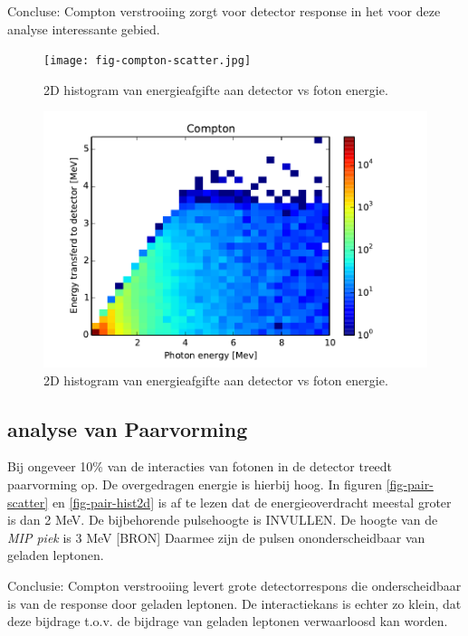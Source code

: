 \documentclass[a4paper,11pt]{article}
\begin{document}
Concluse: Compton verstrooiing zorgt voor detector response in het voor deze analyse interessante gebied.

\begin{figure}[t]
  \begin{center}
    \texttt{[image: fig-compton-scatter.jpg]}
    \caption{\label{fig:compton-scatter} 2D histogram van energieafgifte aan detector vs foton energie.}
  \end{center}
  \begin{center}
    \includegraphics{fig-compton-hist2d.pdf}
    \caption{\label{fig:compton-hist2d} 2D histogram van energieafgifte aan detector vs foton energie.}
  \end{center}
\end{figure}




\subsection{analyse van Paarvorming}
Bij ongeveer 10\% van de interacties van fotonen in de detector treedt paarvorming op. De overgedragen energie is hierbij hoog. In figuren \ref{fig-pair-scatter} en \ref{fig-pair-hist2d} is af te lezen dat de energieoverdracht meestal groter is dan 2 MeV. De bijbehorende pulsehoogte is INVULLEN. De hoogte van de \textit{MIP piek} is 3 MeV [BRON] Daarmee zijn de pulsen ononderscheidbaar van geladen leptonen.

Conclusie: Compton verstrooiing levert grote detectorrespons die onderscheidbaar is van de response door geladen leptonen. De interactiekans is echter zo klein, dat deze bijdrage t.o.v. de bijdrage van geladen leptonen verwaarloosd kan worden.
\end{document}

